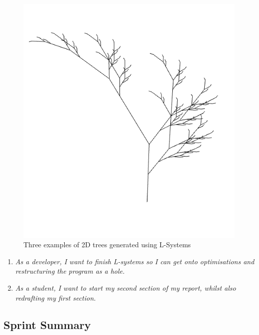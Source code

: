 \documentclass[a4paper,10pt]{report}
\begin{document}
\begin{figure}[h!]
\begin{minipage}{.3\textwidth}
\end{minipage}
\begin{minipage}{.3\textwidth}
  \centering
  \includegraphics[width=.9\linewidth]{tree3.png}
\end{minipage}
\caption{Three examples of 2D trees generated using L-Systems}
 \label{fig:sprint8}

\end{figure}
\begin{enumerate}
\subsection{Sprint Goals}

\item \textit{As a developer, I want to finish L-systems so I can get onto optimisations and restructuring the program as a hole.}

\item \textit{As a student, I want to start my second section of my report, whilst also redrafting my first section.}
\end{enumerate}

\subsection{Sprint Summary}
\end{document}
